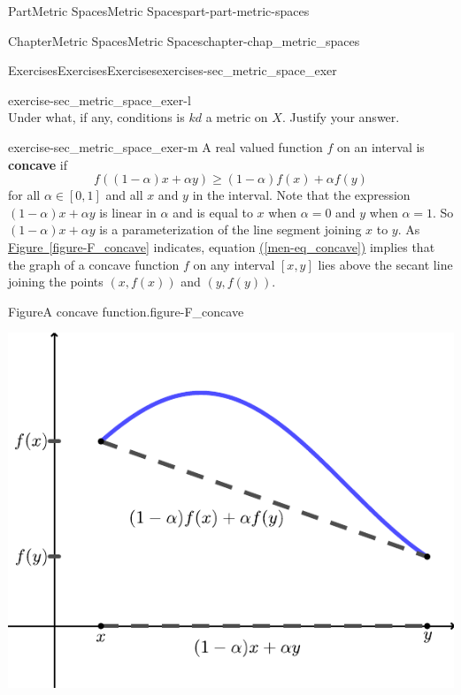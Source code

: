 \documentclass[oneside,10pt,]{book}
\newcommand{\xreffont}{\relax}
\newcommand{\terminology}[1]{\textbf{#1}}
\numberwithin{equation}{chapter}
\begin{document}
\begin{partptx}{Part}{Metric Spaces}{}{Metric Spaces}{}{}{part-part-metric-spaces}
\begin{chapterptx}{Chapter}{Metric Spaces}{}{Metric Spaces}{}{}{chapter-chap_metric_spaces}
\begin{exercises-section}{Exercises}{Exercises}{}{Exercises}{}{}{exercises-sec_metric_space_exer}
\begin{divisionexercise}{12}{}{}{exercise-sec_metric_space_exer-l}
\begin{equation*}
\end{equation*}
Under what, if any, conditions is \(kd\) a metric on \(X\). Justify your answer.%
\end{divisionexercise}%
\begin{divisionexercise}{13}{}{}{exercise-sec_metric_space_exer-m}%
A real valued function \(f\) on an interval is \terminology{concave} if%
\begin{equation}
f((1-\alpha)x + \alpha y) \geq (1-\alpha)f(x) + \alpha f(y)\label{men-eq_concave}
\end{equation}
for all \(\alpha \in [0,1]\) and all \(x\) and \(y\) in the interval. Note that the expression \((1-\alpha)x + \alpha y\) is linear in \(\alpha\) and is equal to \(x\) when \(\alpha = 0\) and \(y\) when \(\alpha = 1\). So \((1-\alpha)x + \alpha y\) is a parameterization of the line segment joining \(x\) to \(y\). As \hyperref[figure-F_concave]{Figure~{\xreffont\ref{figure-F_concave}}} indicates, equation \hyperref[men-eq_concave]{({\xreffont\ref{men-eq_concave}})} implies that the graph of a concave function \(f\) on any interval \([x,y]\) lies above the secant line joining the points \((x,f(x))\) and \((y,f(y))\).%
\begin{figureptx}{Figure}{A concave function.}{figure-F_concave}{}%
\begin{image}{0.25}{0.5}{0.25}{}%
\includegraphics[width=\linewidth]{external/Concave.pdf}
\end{image}%
\tcblower
\end{figureptx}%
\begin{enumerate}[font=\bfseries,label=(\alph*),ref=\alph*]%

\end{enumerate}
\end{divisionexercise}
\end{exercises-section}
\end{chapterptx}
\end{partptx}
\end{document}
